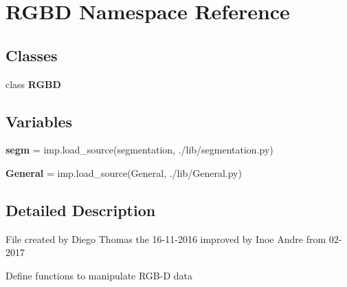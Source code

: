 \section{R\+G\+BD Namespace Reference}
\label{namespace_r_g_b_d}
\subsection*{Classes}
\begin{DoxyCompactItemize}
\item 
class \textbf{ R\+G\+BD}
\end{DoxyCompactItemize}
\subsection*{Variables}
\begin{DoxyCompactItemize}
\item 
\mbox{\label{namespace_r_g_b_d_abe85728633b79c251501dd2da73b1998}} 
{\bfseries segm} = imp.\+load\+\_\+source(\textquotesingle{}segmentation\textquotesingle{}, \textquotesingle{}./lib/segmentation.\+py\textquotesingle{})
\item 
\mbox{\label{namespace_r_g_b_d_a9bdfe6a4ba168d5584046e026d1ed2fa}} 
{\bfseries General} = imp.\+load\+\_\+source(\textquotesingle{}General\textquotesingle{}, \textquotesingle{}./lib/General.\+py\textquotesingle{})
\end{DoxyCompactItemize}


\subsection{Detailed Description}
\begin{DoxyVerb} File created by Diego Thomas the 16-11-2016
 improved by Inoe Andre from 02-2017

 Define functions to manipulate RGB-D data
\end{DoxyVerb}
 